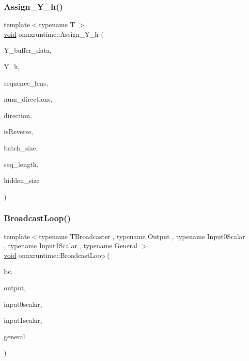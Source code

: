 \subsubsection{\texorpdfstring{Assign\+\_\+\+Y\+\_\+h()}{Assign\_Y\_h()}}
{\footnotesize\ttfamily template$<$typename T $>$ \\
\mbox{\hyperlink{mlasi_8h_a88f941d423cb2a819b70a1358982b1a6}{void}} onnxruntime\+::\+Assign\+\_\+\+Y\+\_\+h (\begin{DoxyParamCaption}\item[{const T $\ast$}]{Y\+\_\+buffer\+\_\+data,  }\item[{\mbox{\hyperlink{classonnxruntime_1_1Tensor}{Tensor}} $\ast$}]{Y\+\_\+h,  }\item[{const \mbox{\hyperlink{classonnxruntime_1_1Tensor}{Tensor}} $\ast$}]{sequence\+\_\+lens,  }\item[{int64\+\_\+t}]{num\+\_\+directions,  }\item[{int}]{direction,  }\item[{bool}]{is\+Reverse,  }\item[{int64\+\_\+t}]{batch\+\_\+size,  }\item[{int64\+\_\+t}]{seq\+\_\+length,  }\item[{int64\+\_\+t}]{hidden\+\_\+size }\end{DoxyParamCaption})}

\mbox{\label{namespaceonnxruntime_a04ecd366b25e02c905a08b3f0381c1d3}} 
\subsubsection{\texorpdfstring{Broadcast\+Loop()}{BroadcastLoop()}}
{\footnotesize\ttfamily template$<$typename T\+Broadcaster , typename Output , typename Input0\+Scalar , typename Input1\+Scalar , typename General $>$ \\
\mbox{\hyperlink{mlasi_8h_a88f941d423cb2a819b70a1358982b1a6}{void}} onnxruntime\+::\+Broadcast\+Loop (\begin{DoxyParamCaption}\item[{\mbox{\hyperlink{structonnxruntime_1_1TBroadcaster}{T\+Broadcaster}} \&}]{bc,  }\item[{Output \&}]{output,  }\item[{Input0\+Scalar}]{input0scalar,  }\item[{Input1\+Scalar}]{input1scalar,  }\item[{General}]{general }\end{DoxyParamCaption})}

